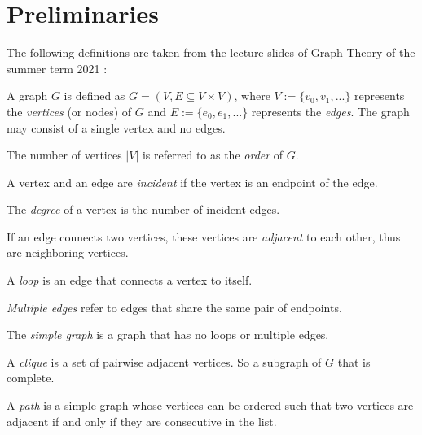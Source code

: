 \section{Preliminaries}\label{sec:prelimn}
The following definitions are taken from the lecture slides of Graph Theory of the summer term 2021 \cite{GraphTheorySchindelhaauer2021}:
\begin{definition}
    A graph $G$ is defined as $G = (V, E \subseteq V \times V)$, where $V := \{v_0, v_1,...\}$ represents the \textit{vertices} (or nodes) of $G$ and $E := \{e_0, e_1,...\}$ represents the \textit{edges}. The graph may consist of a single vertex and no edges.
\end{definition}

\begin{definition}
    The number of vertices $|V|$ is referred to as the \textit{order} of $G$.
    
    A vertex and an edge are \textit{incident} if the vertex is an endpoint of the edge.
    
    The \textit{degree} of a vertex is the number of incident edges.
\end{definition}

\begin{definition}[Adjacent]
    If an edge connects two vertices, these vertices are \textit{adjacent} to each other, thus are neighboring vertices.
\end{definition}
\begin{definition}
    A \textit{loop} is an edge that connects a vertex to itself.
    
    \textit{Multiple edges} refer to edges that share the same pair of endpoints.
    
    The \textit{simple graph} is a graph that has no loops or multiple edges.
\end{definition}

\begin{definition}[Clique]
    A \textit{clique} is a set of pairwise adjacent vertices. So a subgraph of $G$ that is complete.
\end{definition}

\begin{definition}[Path]
    A \textit{path} is a simple graph whose vertices can be ordered such that two vertices are adjacent if and only if they are consecutive in the list.
\end{definition}

